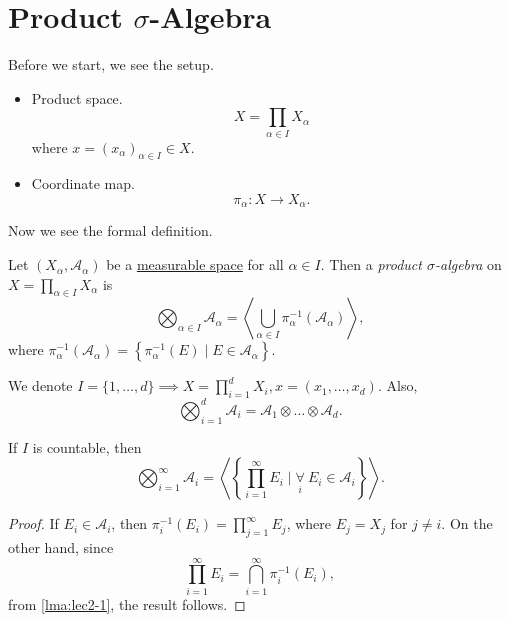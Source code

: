 \section{Product \(\sigma\)-Algebra}
Before we start, we see the setup.
\begin{itemize}
	\item Product space.
	      \[
		      X = \prod_{\alpha \in I} X_\alpha
	      \]
	      where \(x = (x_\alpha )_{\alpha \in I}\in X\).
	\item Coordinate map.
	      \[
		      \pi _\alpha \colon X\to X_\alpha.
	      \]
\end{itemize}

Now we see the formal definition.
\begin{definition}\label{def:product-sigma-algebra}
	Let \((X_\alpha , \mathcal{A} _\alpha )\) be a \hyperref[def:measurable-space]{measurable space} for all \(\alpha \in I\).
	Then a \emph{product \(\sigma\)-algebra} on \(X = \prod_{\alpha \in I} X_\alpha \) is
	\[
		\bigotimes_{\alpha \in I}\mathcal{A} _\alpha = \left< \bigcup_{\alpha \in I} \pi ^{-1} _{\alpha }\left(\mathcal{A} _\alpha \right)  \right>,
	\]
	where \(\pi ^{-1} _\alpha \left(\mathcal{A} _\alpha \right) = \left\{\pi ^{-1} _\alpha (E) \mid E\in \mathcal{A} _\alpha \right\}\).
\end{definition}

\begin{notation}
	We denote \(I = \{1, \dots , d\} \implies X = \prod_{i=1}^{d} X_{i}, x = (x_1, \dots , x_d )\). Also,
	\[
		\bigotimes_{i = 1}^d \mathcal{A} _{i} = \mathcal{A} _1\otimes \dots \otimes \mathcal{A} _d.
	\]
\end{notation}

\begin{lemma}
	If \(I\) is countable, then
	\[
		\bigotimes_{i = 1}^{\infty}\mathcal{A} _{i} = \left< \left\{\prod_{i = 1}^{\infty} E_{i} \mid \underset{i}{\forall }\ E_{i}\in \mathcal{A} _{i}\right\} \right>.
	\]
\end{lemma}
\begin{proof}
	If \(E_i \in \mathcal{A} _{i}\), then \(\pi ^{-1} _{i} (E_{i} ) = \prod_{j=1}^{\infty } E_{j}\), where \(E_{j} = X_j\) for \(j\neq i\). On the other hand, since
	\[
		\prod_{i=1}^{\infty } E_{i} = \bigcap_{i=1}^{\infty } \pi ^{-1} _{i} (E_{i} ),
	\]
	from \autoref{lma:lec2-1}, the result follows.
\end{proof}